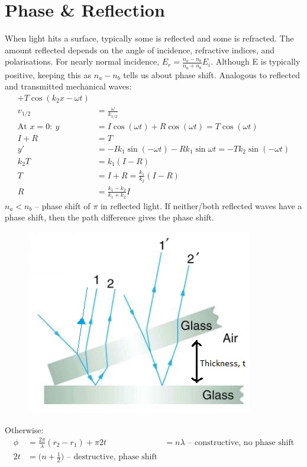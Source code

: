 \documentclass[a4paper, 11pt, normalem]{report}
\begin{document}
\section{Phase \& Reflection}
When light hits a surface, typically some is reflected and some is refracted.
The amount reflected depends on the angle of incidence, refractive indices, and polarisations.
For nearly normal incidence, $E_{r} = \frac{n_{a} - n_{b}}{n_{a} + n_{b}}E_{i}$.
Although E is typically positive, keeping this as $n_{a} - n_{b}$ tells us about phase shift.
Analogous to reflected and transmitted mechanical waves:
\begin{align}
    [I\cos{(k_{1}x - \omega t)} &+ R\cos{(k_{1}x - \omega t)}] + T\cos{(k_{2}x - \omega t)} \\
    v_{1/2} &= \frac{\omega}{k_{1/2}} \\
    \text{At }x = 0:~y &= I\cos{(\omega t)} + R\cos{(\omega t)} = T\cos{(\omega t)} \\
    I + R &= T \\
    y' &= -Ik_{1}\sin{(-\omega t)} - Rk_{1}\sin{\omega t} = -Tk_{2}\sin{(-\omega t)} \\
    k_{2}T &= k_{1}(I - R) \\
    T &= I + R = \frac{k_{1}}{k_{2}}(I - R) \\
    R &= \frac{k_{1} - k_{2}}{k_{1} + k_{2}}I
\end{align}
$n_{a} < n_{b}$ -- phase shift of $\pi$ in reflected light.
If neither/both reflected waves have a phase shift, then the path difference gives the phase shift.
\begin{figure}[H]
    \centering
    \includegraphics[scale=0.8]{Thickness.jpg}
\end{figure}
Otherwise:
\begin{align}
    \phi &= \frac{2\pi}{\lambda}(r_{2} - r_{1}) + \pi
    2t &= n\lambda \text{ -- constructive, no phase shift} \\
    2t &= \Big(n + \frac{1}{2}\Big)\text{ -- destructive, phase shift}
\end{align}
\end{document}
